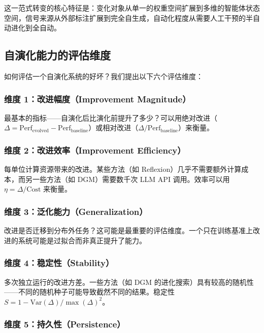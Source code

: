 这一范式转变的核心特征是：变化对象从单一的权重空间扩展到多维的智能体状态空间，信号来源从外部标注扩展到完全自生成，自动化程度从需要人工干预的半自动进化到全自动。

\subsection{自演化能力的评估维度}\label{sec:intro-eval-dims}

如何评估一个自演化系统的好坏？我们提出以下六个评估维度：

\subsubsection{维度 1：改进幅度（Improvement Magnitude）}

最基本的指标——自演化后比演化前提升了多少？可以用绝对改进（$\Delta = \text{Perf}_{\mathrm{evolved}} - \text{Perf}_{\mathrm{baseline}}$）或相对改进（$\Delta / \text{Perf}_{\mathrm{baseline}}$）来衡量。

\subsubsection{维度 2：改进效率（Improvement Efficiency）}

每单位计算资源带来的改进。某些方法（如 Reflexion）几乎不需要额外计算成本，而另一些方法（如 DGM）需要数千次 LLM API 调用。效率可以用 $\eta = \Delta / \text{Cost}$ 来衡量。

\subsubsection{维度 3：泛化能力（Generalization）}

改进是否迁移到分布外任务？这可能是最重要的评估维度。一个只在训练基准上改进的系统可能是过拟合而非真正提升了能力。

\subsubsection{维度 4：稳定性（Stability）}

多次独立运行的改进方差。一些方法（如 DGM 的进化搜索）具有较高的随机性——不同的随机种子可能导致截然不同的结果。稳定性 $S = 1 - \mathrm{Var}(\Delta) / \max(\Delta)^2$。

\subsubsection{维度 5：持久性（Persistence）}

